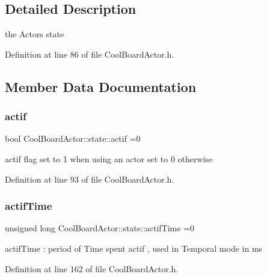 \subsection{Detailed Description}
the Actor\textquotesingle{}s state 

Definition at line 86 of file Cool\+Board\+Actor.\+h.



\subsection{Member Data Documentation}
\mbox{\label{struct_cool_board_actor_1_1state_a7963178c2de01ef0d2861f9f59ad6f3c}} 
\subsubsection{\texorpdfstring{actif}{actif}}
{\footnotesize\ttfamily bool Cool\+Board\+Actor\+::state\+::actif =0}

actif flag set to 1 when using an actor set to 0 otherwise 

Definition at line 93 of file Cool\+Board\+Actor.\+h.

\mbox{\label{struct_cool_board_actor_1_1state_a534119a22a09b29ecb446b277d5b2ef5}} 
\subsubsection{\texorpdfstring{actif\+Time}{actifTime}}
{\footnotesize\ttfamily unsigned long Cool\+Board\+Actor\+::state\+::actif\+Time =0}

actif\+Time \+: period of Time spent actif , used in Temporal mode in ms 

Definition at line 162 of file Cool\+Board\+Actor.\+h.

\mbox{\label{struct_cool_board_actor_1_1state_acd1af3ac2382258a5b05497d814adc01}} 
